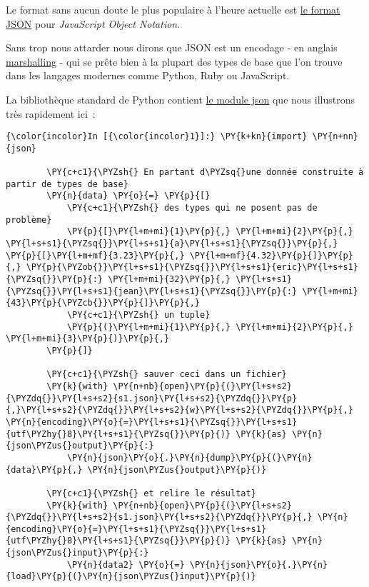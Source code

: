    Le format sans aucun doute le plus populaire à l'heure actuelle est
\href{http://fr.wikipedia.org/wiki/JavaScript_Object_Notation}{le format
JSON} pour \emph{JavaScript Object Notation}.

Sans trop nous attarder nous dirons que JSON est un encodage - en
anglais
\href{http://en.wikipedia.org/wiki/Marshalling_\%28computer_science\%29}{marshalling}
- qui se prête bien à la plupart des types de base que l'on trouve dans
les langages modernes comme Python, Ruby ou JavaScript.

La bibliothèque standard de Python contient
\href{https://docs.python.org/3/library/json.html}{le module json} que
nous illustrons très rapidement ici~:

    \begin{Verbatim}[commandchars=\\\{\},frame=single,framerule=0.3mm,rulecolor=\color{cellframecolor}]
{\color{incolor}In [{\color{incolor}1}]:} \PY{k+kn}{import} \PY{n+nn}{json}
        
        \PY{c+c1}{\PYZsh{} En partant d\PYZsq{}une donnée construite à partir de types de base}
        \PY{n}{data} \PY{o}{=} \PY{p}{[}
            \PY{c+c1}{\PYZsh{} des types qui ne posent pas de problème}
            \PY{p}{[}\PY{l+m+mi}{1}\PY{p}{,} \PY{l+m+mi}{2}\PY{p}{,} \PY{l+s+s1}{\PYZsq{}}\PY{l+s+s1}{a}\PY{l+s+s1}{\PYZsq{}}\PY{p}{,} \PY{p}{[}\PY{l+m+mf}{3.23}\PY{p}{,} \PY{l+m+mf}{4.32}\PY{p}{]}\PY{p}{,} \PY{p}{\PYZob{}}\PY{l+s+s1}{\PYZsq{}}\PY{l+s+s1}{eric}\PY{l+s+s1}{\PYZsq{}}\PY{p}{:} \PY{l+m+mi}{32}\PY{p}{,} \PY{l+s+s1}{\PYZsq{}}\PY{l+s+s1}{jean}\PY{l+s+s1}{\PYZsq{}}\PY{p}{:} \PY{l+m+mi}{43}\PY{p}{\PYZcb{}}\PY{p}{]}\PY{p}{,}
            \PY{c+c1}{\PYZsh{} un tuple}
            \PY{p}{(}\PY{l+m+mi}{1}\PY{p}{,} \PY{l+m+mi}{2}\PY{p}{,} \PY{l+m+mi}{3}\PY{p}{)}\PY{p}{,}
        \PY{p}{]}
        
        \PY{c+c1}{\PYZsh{} sauver ceci dans un fichier}
        \PY{k}{with} \PY{n+nb}{open}\PY{p}{(}\PY{l+s+s2}{\PYZdq{}}\PY{l+s+s2}{s1.json}\PY{l+s+s2}{\PYZdq{}}\PY{p}{,}\PY{l+s+s2}{\PYZdq{}}\PY{l+s+s2}{w}\PY{l+s+s2}{\PYZdq{}}\PY{p}{,} \PY{n}{encoding}\PY{o}{=}\PY{l+s+s1}{\PYZsq{}}\PY{l+s+s1}{utf\PYZhy{}8}\PY{l+s+s1}{\PYZsq{}}\PY{p}{)} \PY{k}{as} \PY{n}{json\PYZus{}output}\PY{p}{:}
            \PY{n}{json}\PY{o}{.}\PY{n}{dump}\PY{p}{(}\PY{n}{data}\PY{p}{,} \PY{n}{json\PYZus{}output}\PY{p}{)}
        
        \PY{c+c1}{\PYZsh{} et relire le résultat}
        \PY{k}{with} \PY{n+nb}{open}\PY{p}{(}\PY{l+s+s2}{\PYZdq{}}\PY{l+s+s2}{s1.json}\PY{l+s+s2}{\PYZdq{}}\PY{p}{,} \PY{n}{encoding}\PY{o}{=}\PY{l+s+s1}{\PYZsq{}}\PY{l+s+s1}{utf\PYZhy{}8}\PY{l+s+s1}{\PYZsq{}}\PY{p}{)} \PY{k}{as} \PY{n}{json\PYZus{}input}\PY{p}{:}
            \PY{n}{data2} \PY{o}{=} \PY{n}{json}\PY{o}{.}\PY{n}{load}\PY{p}{(}\PY{n}{json\PYZus{}input}\PY{p}{)}
\end{Verbatim}


